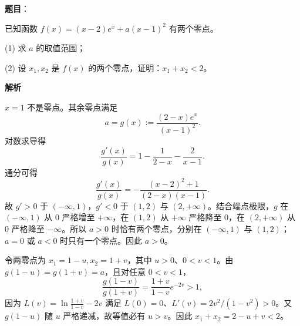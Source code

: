 \begin{answer}

\textbf{题目}：

已知函数 $f(x)=(x-2)e^x+a(x-1)^2$ 有两个零点。

   (1) 求 $a$ 的取值范围；

   (2) 设 $x_1,x_2$ 是 $f(x)$ 的两个零点，证明：$x_1+x_2<2$。

\textbf{解析}


\(x=1\) 不是零点。其余零点满足
\nopagebreak[4]
\[
a=g(x):=\frac{(2-x)e^x}{(x-1)^2}.
\]
对数求导得
\nopagebreak[4]
\[
\frac{g'(x)}{g(x)}=1-\frac1{2-x}-\frac2{x-1}.
\]
通分可得
\nopagebreak[4]
\[
\frac{g'(x)}{g(x)}
=-\frac{(x-2)^2+1}{(2-x)(x-1)}.
\]
故 \(g'>0\) 于 \((-\infty,1)\)，\(g'<0\) 于 \((1,2)\) 与 \((2,+\infty)\)。结合端点极限，\(g\) 在 \((-\infty,1)\) 从 0 严格增至 \(+\infty\)，在 \((1,2)\) 从 \(+\infty\) 严格降至 0，在 \((2,+\infty)\) 从 0 严格降至 \(-\infty\)。所以 \(a>0\) 时恰有两个零点，分别在 \((-\infty,1)\) 与 \((1,2)\)；\(a=0\) 或 \(a<0\) 时只有一个零点。因此 \(a>0\)。


令两零点为 \(x_1=1-u,x_2=1+v\)，其中 \(u>0\)、\(0<v<1\)。由 \(g(1-u)=g(1+v)=a\)，且对任意 \(0<v<1\)，
\nopagebreak[4]
\[
\frac{g(1-v)}{g(1+v)}=\frac{1+v}{1-v}e^{-2v}>1,
\]
因为 \(L(v)=\ln\frac{1+v}{1-v}-2v\) 满足 \(L(0)=0\)、\(L'(v)=2v^2/(1-v^2)>0\)。又 \(g(1-u)\) 随 \(u\) 严格递减，故等值必有 \(u>v\)。因此 \(x_1+x_2=2-u+v<2\)。



\end{answer}
